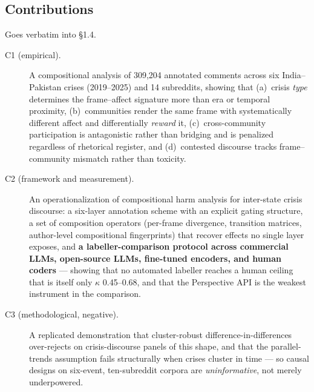 
\subsection*{Contributions}

Goes verbatim into \S1.4.

\begin{description}
\item[C1 (empirical).] A compositional analysis of 309,204 annotated comments
  across six India--Pakistan crises (2019--2025) and 14 subreddits, showing that
  (a)~crisis \emph{type} determines the frame--affect signature more than era or
  temporal proximity, (b)~communities render the same frame with systematically
  different affect and differentially \emph{reward} it, (c)~cross-community
  participation is antagonistic rather than bridging and is penalized regardless
  of rhetorical register, and (d)~contested discourse tracks frame--community
  mismatch rather than toxicity.

\item[C2 (framework and measurement).] An operationalization of compositional
  harm analysis for inter-state crisis discourse: a six-layer annotation scheme
  with an explicit gating structure, a set of composition operators (per-frame
  divergence, transition matrices, author-level compositional fingerprints) that
  recover effects no single layer exposes, and \textbf{a labeller-comparison
  protocol across commercial LLMs, open-source LLMs, fine-tuned encoders, and
  human coders} --- showing that no automated labeller reaches a human ceiling
  that is itself only $\kappa$ 0.45--0.68, and that the Perspective API is the
  weakest instrument in the comparison.

\item[C3 (methodological, negative).] A replicated demonstration that
  cluster-robust difference-in-differences over-rejects on crisis-discourse
  panels of this shape, and that the parallel-trends assumption fails
  structurally when crises cluster in time --- so causal designs on six-event,
  ten-subreddit corpora are \emph{uninformative}, not merely underpowered.
\end{description}